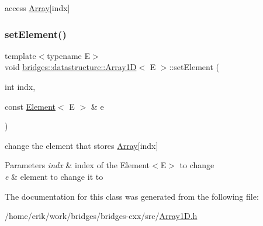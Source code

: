 access \hyperlink{classbridges_1_1datastructure_1_1_array}{Array}\mbox{[}indx\mbox{]} 

\mbox{\label{classbridges_1_1datastructure_1_1_array1_d_a1494c33b1f37bc4c9bc983f1f181488f}} 
\subsubsection{\texorpdfstring{set\+Element()}{setElement()}}
{\footnotesize\ttfamily template$<$typename E$>$ \\
void \hyperlink{classbridges_1_1datastructure_1_1_array1_d}{bridges\+::datastructure\+::\+Array1D}$<$ E $>$\+::set\+Element (\begin{DoxyParamCaption}\item[{int}]{indx,  }\item[{const \hyperlink{classbridges_1_1datastructure_1_1_element}{Element}$<$ E $>$ \&}]{e }\end{DoxyParamCaption})\hspace{0.3cm}{\ttfamily [inline]}}



change the element that stores \hyperlink{classbridges_1_1datastructure_1_1_array}{Array}\mbox{[}indx\mbox{]} 


\begin{DoxyParams}{Parameters}
{\em indx} & index of the Element$<$\+E$>$ to change \\
\hline
{\em e} & element to change it to \\
\hline
\end{DoxyParams}


The documentation for this class was generated from the following file\+:\begin{DoxyCompactItemize}
\item 
/home/erik/work/bridges/bridges-\/cxx/src/\hyperlink{_array1_d_8h}{Array1\+D.\+h}\end{DoxyCompactItemize}
